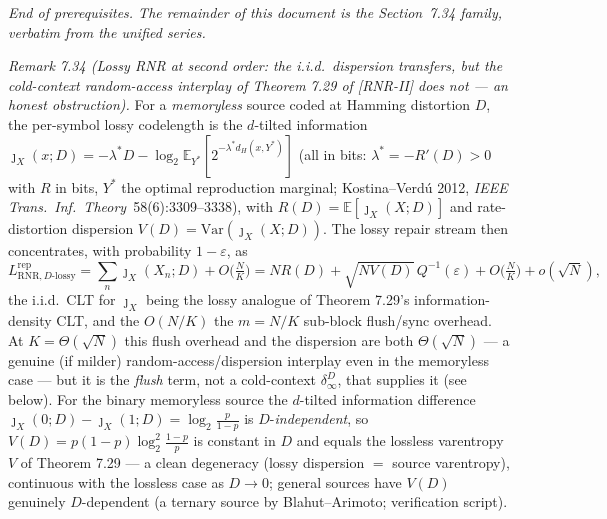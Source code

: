 \documentclass[
]{article}
\begin{document}
\emph{End of prerequisites. The remainder of this document is the Section~7.34
family, verbatim from the unified series.}

\emph{Remark 7.34 (Lossy RNR at second order: the i.i.d.\ dispersion transfers, but the
\emph{cold-context} random-access interplay of Theorem 7.29 of [RNR-II] does not --- an honest
obstruction).} For a
\emph{memoryless} source coded at Hamming distortion $D$, the per-symbol lossy codelength
is the $d$-tilted information $\jmath_X(x;D)=-\lambda^\ast D-\log_2\mathbb E_{Y^\ast}[2^{-
\lambda^\ast d_H(x,Y^\ast)}]$ (all in bits: $\lambda^\ast=-R'(D)>0$ with $R$ in bits,
$Y^\ast$ the optimal reproduction marginal; Kostina--Verd\'u 2012, \emph{IEEE Trans.\
Inf.\ Theory}\ 58(6):3309--3338), with $R(D)=\mathbb E[\jmath_X(X;D)]$ and rate-distortion
dispersion $V(D)=\mathrm{Var}(\jmath_X(X;D))$. The lossy repair stream then concentrates,
with probability $1-\varepsilon$, as
\[
  L^{\mathrm{rep}}_{\mathrm{RNR},D\text{-lossy}}
  =\sum_n\jmath_X(X_n;D)+O\!\bigl(\tfrac NK\bigr)
  =N R(D)+\sqrt{N V(D)}\,Q^{-1}(\varepsilon)+O\!\bigl(\tfrac NK\bigr)+o(\sqrt N),
\]
the i.i.d.\ CLT for $\jmath_X$ being the lossy analogue of Theorem 7.29's
information-density CLT, and the $O(N/K)$ the $m=N/K$ sub-block flush/sync overhead. At
$K=\Theta(\sqrt N)$ this flush overhead and the dispersion are both $\Theta(\sqrt N)$ ---
a genuine (if milder) random-access/dispersion interplay even in the memoryless case ---
but it is the \emph{flush} term, not a cold-context $\delta_\infty^D$, that supplies it
(see below). For the binary memoryless source the
$d$-tilted information difference $\jmath_X(0;D)-\jmath_X(1;D)=\log_2\tfrac{p}{1-p}$ is
$D$-\emph{independent}, so $V(D)=p(1-p)\log_2^2\tfrac{1-p}{p}$ is constant in $D$ and equals
the lossless varentropy $V$ of Theorem 7.29 --- a clean degeneracy (lossy dispersion $=$
source varentropy), continuous with the lossless case as $D\to0$; general sources have
$V(D)$ genuinely $D$-dependent (a ternary source by Blahut--Arimoto; verification script).
\end{document}

